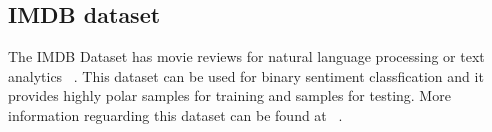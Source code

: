 \subsection{IMDB dataset}
\label{subsec:imdb}
The IMDB Dataset has  movie reviews for natural language processing or text analytics ~\cite{kaggle}. This dataset can be used for binary sentiment 
classfication and it provides  highly polar samples for training and  samples for testing. More information reguarding this dataset can 
be found at ~\cite{refe}.
